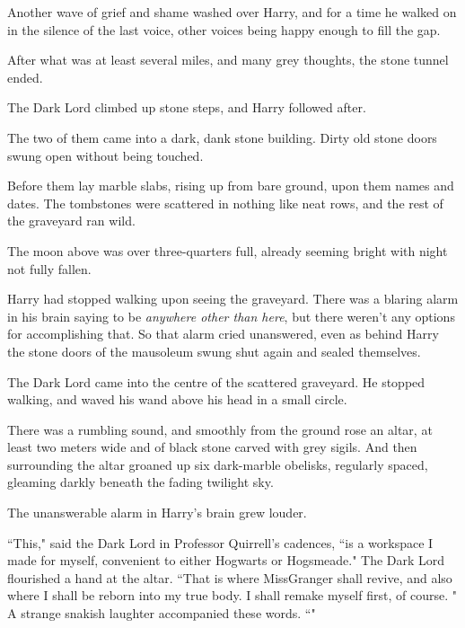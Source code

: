 Another wave of grief and shame washed over Harry, and for a time he walked on in the silence of the last voice, other voices being happy enough to fill the gap.

After what was at least several miles, and many grey thoughts, the stone tunnel ended.

The Dark Lord climbed up stone steps, and Harry followed after.

The two of them came into a dark, dank stone building. Dirty old stone doors swung open without being touched.

Before them lay marble slabs, rising up from bare ground, upon them names and dates. The tombstones were scattered in nothing like neat rows, and the rest of the graveyard ran wild.

The moon above was over three-quarters full, already seeming bright with night not fully fallen.

Harry had stopped walking upon seeing the graveyard. There was a blaring alarm in his brain saying to be \emph{anywhere other than here}, but there weren't any options for accomplishing that. So that alarm cried unanswered, even as behind Harry the stone doors of the mausoleum swung shut again and sealed themselves.

The Dark Lord came into the centre of the scattered graveyard. He stopped walking, and waved his wand above his head in a small circle.

There was a rumbling sound, and smoothly from the ground rose an altar, at least two meters wide and of black stone carved with grey sigils. And then surrounding the altar groaned up six dark-marble obelisks, regularly spaced, gleaming darkly beneath the fading twilight sky.

The unanswerable alarm in Harry's brain grew louder.

``This," said the Dark Lord in Professor Quirrell's cadences, ``is a workspace I made for myself, convenient to either Hogwarts or Hogsmeade." The Dark Lord flourished a hand at the altar. ``That is where Miss\?Granger shall revive, and also where I shall be reborn into my true body. I shall remake myself first, of course. " A strange snakish laughter accompanied these words. ``"

